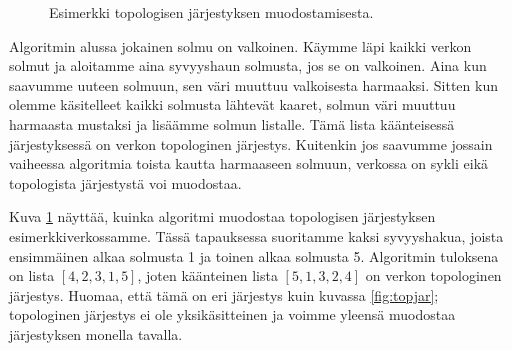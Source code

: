 \begin{figure}
\begin{center}
\end{center}
\caption{Esimerkki topologisen järjestyksen muodostamisesta.}
\label{fig:topesi}
\end{figure}

Algoritmin alussa jokainen solmu on valkoinen.
Käymme läpi kaikki verkon solmut ja aloitamme aina syvyyshaun
solmusta, jos se on valkoinen.
Aina kun saavumme uuteen solmuun, sen väri muuttuu
valkoisesta harmaaksi.
Sitten kun olemme käsitelleet kaikki solmusta lähtevät
kaaret, solmun väri muuttuu harmaasta mustaksi
ja lisäämme solmun listalle.
Tämä lista käänteisessä järjestyksessä on verkon
topologinen järjestys.
Kuitenkin jos saavumme jossain vaiheessa algoritmia
toista kautta harmaaseen solmuun,
verkossa on sykli eikä topologista järjestystä voi muodostaa.

Kuva \ref{fig:topesi} näyttää, kuinka algoritmi muodostaa topologisen
järjestyksen esimerkkiverkossamme.
Tässä tapauksessa suoritamme kaksi syvyyshakua,
joista ensimmäinen alkaa solmusta 1 ja toinen alkaa solmusta 5.
Algoritmin tuloksena on lista $[4,2,3,1,5]$,
joten käänteinen lista $[5,1,3,2,4]$ on verkon topologinen järjestys.
Huomaa, että tämä on eri järjestys kuin kuvassa \ref{fig:topjar};
topologinen järjestys ei ole yksikäsitteinen ja voimme yleensä
muodostaa järjestyksen monella tavalla.

